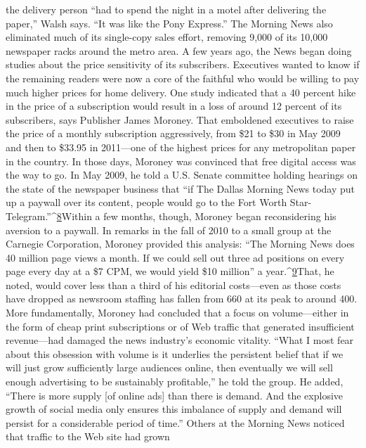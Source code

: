 the delivery person ``had to spend the night in a motel after delivering the paper,''
Walsh says. ``It was like the Pony Express.'' The Morning News also eliminated
much of its single-copy sales effort, removing 9,000 of its 10,000 newspaper
racks around the metro area.
A few years ago, the News began doing studies about the price sensitivity of
its subscribers. Executives wanted to know if the remaining readers were now a
core of the faithful who would be willing to pay much higher prices for home
delivery. One study indicated that a 40 percent hike in the price of a subscription
would result in a loss of around 12 percent of its subscribers, says Publisher James
Moroney. That emboldened executives to raise the price of a monthly subscription
aggressively, from \$21 to \$30 in May 2009 and then to \$33.95 in 2011—one
of the highest prices for any metropolitan paper in the country.
In those days, Moroney was convinced that free digital access was the way
to go. In May 2009, he told a U.S. Senate committee holding hearings on the
state of the newspaper business that ``if The Dallas Morning News today put up
a paywall over its content, people would go to the Fort Worth Star-Telegram.''^{\href{#endnotes-chapter-5}{8}}Within a few months, though, Moroney began reconsidering his aversion to a
paywall. In remarks in the fall of 2010 to a small group at the Carnegie Corporation,
Moroney provided this analysis: ``The Morning News does 40 million page
views a month. If we could sell out three ad positions on every page every day at
a \$7 CPM, we would yield \$10 million'' a year.^{\href{#endnotes-chapter-5}{9}}That, he noted, would cover less
than a third of his editorial costs—even as those costs have dropped as newsroom
staffing has fallen from 660 at its peak to around 400.
More fundamentally, Moroney had concluded that a focus on volume—either
in the form of cheap print subscriptions or of Web traffic that generated insufficient
revenue—had damaged the news industry's economic vitality. ``What I
most fear about this obsession with volume is it underlies the persistent belief
that if we will just grow sufficiently large audiences online, then eventually we
will sell enough advertising to be sustainably profitable,'' he told the group. He
added, ``There is more supply [of online ads] than there is demand. And the explosive
growth of social media only ensures this imbalance of supply and demand
will persist for a considerable period of time.''
Others at the Morning News noticed that traffic to the Web site had grown
